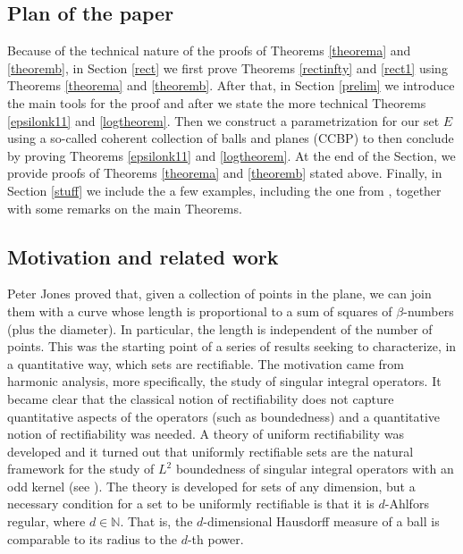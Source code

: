 \documentclass[11pt, twoside, leqno]{article}
\numberwithin{equation}{section}
\theoremstyle{plain}
\theoremstyle{definition}
\newcommand{\N}{\mathbb{N}}
\begin{document}
\subsection{Plan of the paper}


Because of the technical nature of the proofs of Theorems \ref{theorema} and \ref{theoremb}, in Section \ref{rect} we first prove Theorems \ref{rectinfty} and \ref{rect1} using Theorems \ref{theorema} and \ref{theoremb}. After that, in Section \ref{prelim} we introduce the main tools for the proof and after we state the more technical Theorems \ref{epsilonk11} and \ref{logtheorem}. Then we construct a parametrization for our set $E$ using a so-called coherent collection of balls and planes (CCBP) to then conclude by proving Theorems \ref{epsilonk11} and \ref{logtheorem}. At the end of the Section, we provide proofs of Theorems \ref{theorema} and \ref{theoremb} stated above. 
Finally, in Section \ref{stuff} we include the a few examples, including the one from \cite{anzellottiserapioni}, together with some remarks on the main Theorems.


\subsection{Motivation and related work} \label{motivation}

Peter Jones \cite{atst} proved that, given a collection of points in the plane, we can join them with a curve whose length is proportional to a sum of squares of $\beta$-numbers (plus the diameter). In particular, the length is independent of the number of points. This was the starting point of a series of results seeking to characterize, in a quantitative way, which sets are rectifiable. The motivation came from harmonic analysis, more specifically, the study of singular integral operators. It became clear that the classical notion of rectifiability does not capture quantitative aspects of the operators (such as boundedness) and a quantitative notion of rectifiability was needed. A theory of uniform rectifiability was developed and it turned out that uniformly rectifiable sets are the natural framework for the study of $L^2$ boundedness of singular integral operators with an odd kernel (see   \cite{davidsemmes93, davidsemmes91, tolsabook}).
The theory is developed for sets of any dimension, but a necessary condition for a set to be uniformly rectifiable is that it is $d$-Ahlfors regular, where $d \in \N$. That is, the $d$-dimensional Hausdorff measure of a ball is comparable to its radius to the $d$-th power. 
\end{document}

